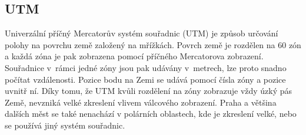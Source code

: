 \subsection{UTM}
Univerzální příčný Mercatorův systém souřadnic (UTM)\cite{UTM} je způsob
určování polohy na povrchu země založený na mřížkách. Povrch země je rozdělen na
60 zón a každá zóna je pak zobrazena pomocí příčného Mercatorova
zobrazení. Souřadnice v~rámci jedné zóny jsou pak udávány v~metrech, lze proto
snadno počítat vzdálenosti. Pozice bodu na Zemi se udává pomocí čísla zóny a
pozice uvnitř ní. Díky tomu, že UTM kvůli rozdělení na zóny zobrazuje vždy úzký
pás Země, nevzniká velké zkreslení vlivem válcového zobrazení. Praha a většina
dalších měst se také nenachází v polárních oblastech, kde je zkreslení velké,
nebo se používá jiný systém souřadnic.

